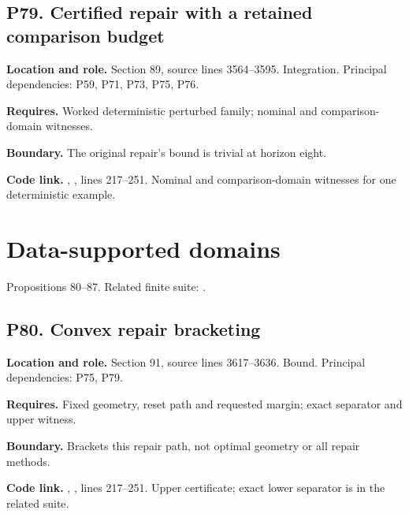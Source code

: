 \documentclass[11pt,letterpaper]{article}
\begin{document}
\par\noindent\begin{minipage}{\textwidth}
\subsection{P79. Certified repair with a retained comparison
budget}\label{p79.-certified-repair-with-a-retained-comparison-budget}

\textbf{Location and role.} Section 89, source lines 3564--3595.
Integration. Principal dependencies: P59, P71, P73, P75, P76.

\textbf{Requires.} Worked deterministic perturbed family; nominal and
comparison-domain witnesses.

\textbf{Boundary.} The original repair's bound is trivial at horizon
eight.

\textbf{Code link.} ,
, lines 217--251. Nominal and
comparison-domain witnesses for one deterministic example.
\end{minipage}\par\medskip

\newpage

\section{Data-supported domains}\label{data-supported-domains}

Propositions 80--87. Related finite suite:
.

\par\noindent\begin{minipage}{\textwidth}
\subsection{P80. Convex repair
bracketing}\label{p80.-convex-repair-bracketing}

\textbf{Location and role.} Section 91, source lines 3617--3636. Bound.
Principal dependencies: P75, P79.

\textbf{Requires.} Fixed geometry, reset path and requested margin;
exact separator and upper witness.

\textbf{Boundary.} Brackets this repair path, not optimal geometry or
all repair methods.

\textbf{Code link.} ,
, lines 217--251. Upper certificate; exact
lower separator is in the related suite.
\end{minipage}\par\medskip
\end{document}
